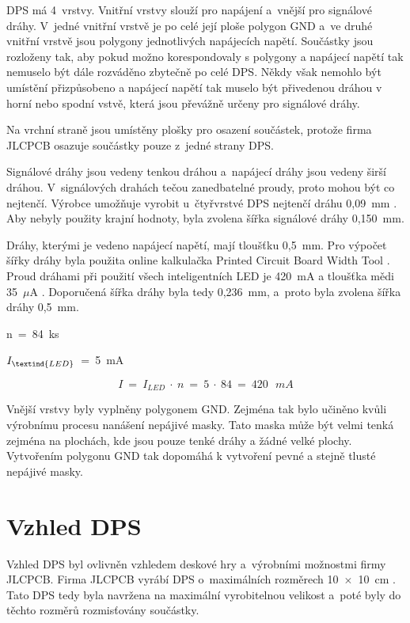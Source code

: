   DPS má 4~vrstvy. Vnitřní vrstvy slouží pro napájení a~vnější pro signálové dráhy. V~jedné vnitřní vrstvě je po celé její ploše 
  polygon GND a~ve druhé vnitřní vrstvě jsou polygony jednotlivých napájecích napětí. Součástky jsou rozloženy tak, aby pokud možno
  korespondovaly s polygony a napájecí napětí tak nemuselo být dále rozváděno zbytečně po celé DPS. Někdy však nemohlo být umístění 
  přizpůsobeno a napájecí napětí tak muselo být přivedenou dráhou v horní nebo spodní vstvě, která jsou převážně určeny pro signálové 
  dráhy. 

  Na vrchní straně jsou umístěny plošky pro osazení součástek, protože firma JLCPCB osazuje součástky pouze z~jedné strany DPS.

  Signálové dráhy jsou vedeny tenkou dráhou a~napájecí dráhy jsou vedeny širší dráhou. V~signálových drahách tečou zanedbatelné 
  proudy, proto mohou být co nejtenčí. Výrobce umožňuje vyrobit u~čtyřvrstvé DPS nejtenčí dráhu 0,09~mm \cite{JLCPCB_Capabilities}. 
  Aby nebyly použity krajní hodnoty, byla zvolena šířka signálové dráhy 0,150~mm.

  Dráhy, kterými je vedeno napájecí napětí, mají tloušťku 0,5~mm. Pro výpočet šířky dráhy byla použita online kalkulačka Printed
  Circuit Board Width Tool \cite{Kalkulacka_drahy_DPS}. Proud dráhami při použití všech inteligentních LED je 420~mA a tloušťka 
  mědi 35~$\mu$A \cite{JLCPCB_Capabilities}. Doporučená šířka dráhy byla tedy 0,236~mm, a~proto byla zvolena šířka dráhy 0,5~mm.

  n~=~84~ks

  $I_\textind{LED}$~=~5~mA 

  \begin{equation} 
    I~=~I_{LED}~\cdot~n~=~5~\cdot~84~=~420~\:~mA
  \end{equation}

  Vnější vrstvy byly vyplněny polygonem GND. Zejména tak bylo učiněno kvůli výrobnímu procesu nanášení nepájivé masky. Tato maska
  může být velmi tenká zejména na plochách, kde jsou pouze tenké dráhy a žádné velké plochy. Vytvořením polygonu GND tak dopomáhá k 
  vytvoření pevné a stejně tlusté nepájivé masky. 

  \section{Vzhled DPS}
  Vzhled DPS byl ovlivněn vzhledem deskové hry a~výrobními možnostmi firmy JLCPCB. Firma JLCPCB vyrábí DPS o~maximálních 
  rozměrech 10~$\times$~10~cm \cite{JLCPCB}. Tato DPS tedy byla navržena na maximální vyrobitelnou velikost a~poté byly do těchto 
  rozměrů rozmisťovány součástky.

